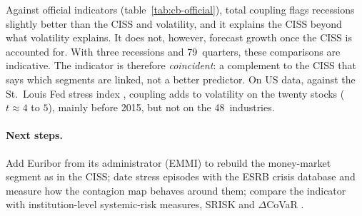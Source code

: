 \documentclass[11pt]{article}
\theoremstyle{definition}
\begin{document}
Against official indicators (table~\ref{tab:cb-official}), total coupling
flags recessions slightly better than the CISS and volatility, and it explains
the CISS beyond what volatility explains. It does not, however, forecast
growth once the CISS is accounted for. With three recessions and
79~quarters, these comparisons are indicative. The indicator is therefore
\emph{coincident}: a complement to the CISS that says which segments are
linked, not a better predictor. On US data, against the St.~Louis Fed stress
index \citep{kliesen2010}, coupling adds to volatility on the twenty stocks
($t\approx4$ to $5$), mainly before 2015, but not on the 48~industries.

\paragraph{Next steps.} Add Euribor from its administrator (EMMI) to rebuild
the money-market segment as in the CISS; date stress episodes with the ESRB
crisis database \citep{loduca2017} and measure how the contagion map behaves
around them; compare the indicator with institution-level systemic-risk
measures, SRISK \citep{brownlees2017} and $\Delta$CoVaR \citep{adrian2016}.




\end{document}
